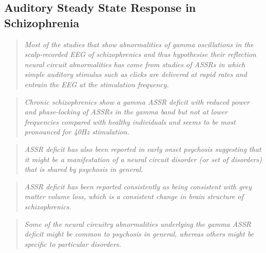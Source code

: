 \subsection{Auditory Steady State Response in Schizophrenia}
\begin{quotation}
	\textit{Most of the studies that show abnormalities of gamma oscillations in the scalp-recorded EEG of schizophrenics and thus hypothesise their reflection neural circuit abnormalities has come from studies of ASSRs in which simple auditory stimulus such as clicks are delivered at rapid rates and entrain the EEG at the stimulation frequency.}
	\begin{flushright}
		\cite{spencer2008gamma}
	\end{flushright}
\end{quotation}
\begin{quotation}
	\textit{Chronic schizophrenics show a gamma ASSR deficit with reduced power and phase-locking of ASSRs in the gamma band but not at lower frequencies compared with healthy individuals and seems to be most pronounced for 40Hz stimulation.}
	\begin{flushright}
		\cite{hong2004evoked}
	\end{flushright}
\end{quotation}
\begin{quotation}
	\textit{ASSR deficit has also been reported in early onset psychosis suggesting that it might be a manifestation of a neural circuit disorder (or set of disorders) that is shared by psychosis in general.}
	\begin{flushright}
		\cite{wilson2008cortical}
	\end{flushright}
\end{quotation}
\begin{quotation}
	\textit{ASSR deficit has been reported consistently as being consistent with grey matter volume loss, which is a consistent change in brain structure of schizophrenics.}
	\begin{flushright}
		\cite{salisbury2007progressive}
	\end{flushright}
\end{quotation}
\begin{quotation}
	\textit{Some of the neural circuitry abnormalities underlying the gamma ASSR deficit might be common to psychosis in general, whereas others might be specific to particular disorders.}
	\begin{flushright}
		\cite{spencer2008gamma}
	\end{flushright}
\end{quotation}
